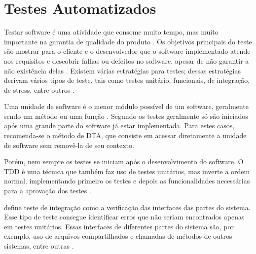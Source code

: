 \section{Testes Automatizados}

Testar software é uma atividade que consome muito tempo, mas muito importante na garantia de qualidade do produto \cite{testing-is-hard}. Os objetivos principais do teste são mostrar para o cliente e o desenvolvedor que o software implementado atende aos requisitos e descobrir falhas ou defeitos no software, apesar de não garantir a não existência delas \cite{sommerville}. Existem várias estratégias para testes; dessas estratégias derivam vários tipos de teste, tais como testes unitário, funcionais, de integração, de stress, entre outros \cite{art-of-testing}.

Uma unidade de software é o menor módulo possível de um software, geralmente sendo um método ou uma função \cite{runeson}. Segundo  os testes geralmente só são iniciados após uma grande parte do software já estar implementada. Para estes casos, recomenda-se o método de DTA, que consiste em acessar diretamente a unidade de software sem removê-la de seu contexto.

Porém, nem sempre os testes se iniciam após o desenvolvimento do software. O TDD é uma técnica que também faz uso de testes unitários, mas inverte a ordem normal, implementando primeiro os testes e depois as funcionalidades necessárias para a aprovação dos testes \cite{tdd}.

 define teste de integração como a verificação das interfaces das partes do sistema. Esse tipo de teste consegue identificar erros que não seriam encontrados apenas em testes unitários. Essas interfaces de diferentes partes do sistema são, por exemplo, uso de arquivos compartilhados e chamadas de métodos de outros sistemas, entre outras \cite{spillner}.


